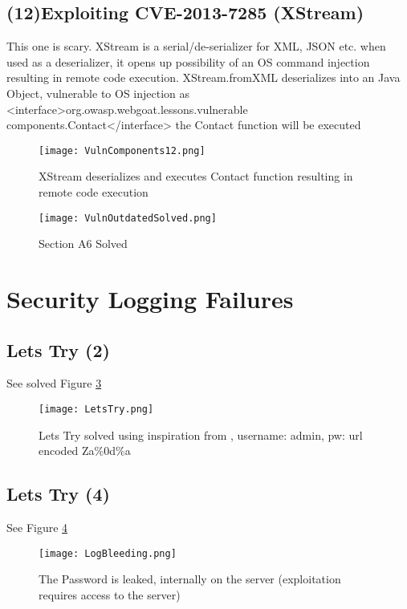 \documentclass[
	letterpaper, %
	10pt, %
	unnumberedsections, %
	twoside, %
]{APAAssignment}
\begin{document}
\begin{appendices}
\subsection{(12)Exploiting CVE-2013-7285 (XStream)}\label{app:VulnAndOutdatedComponents12}\label{app:XStrem}
This one is scary. XStream is a serial/de-serializer for XML, JSON etc. when used as a deserializer, it opens up possibility of an OS command injection resulting in remote code execution. XStream.fromXML deserializes into an Java Object, vulnerable to OS injection as <interface>org.owasp.webgoat.lessons.vulnerable components.Contact</interface> the Contact function will be executed   

\begin{figure}[!ht] %
	\centering
	\texttt{[image: VulnComponents12.png]}
	\caption{XStream deserializes and executes Contact function resulting in remote code execution}
	\label{fig:app:vuln12}
\end{figure}


\begin{figure}[!ht] %
	\centering
	\texttt{[image: VulnOutdatedSolved.png]}
	\caption{Section A6 Solved}
	\label{fig:app:vulnSolved}
\end{figure}

\section{Security Logging Failures}\label{app:SecurityLogging}
\subsection{Lets Try (2)}
See solved Figure \ref{fig:app:LetsTry}

\begin{figure}[!htp] %
	\centering
	\texttt{[image: LetsTry.png]}
	\caption{Lets Try solved using inspiration from \cite{CycubicsDocsWebGoat}, username: admin, pw: url encoded Za\%0d\%a}
	\label{fig:app:LetsTry}
\end{figure}

\subsection{Lets Try (4)}
See Figure \ref{fig:app:LogBleeding}

\begin{figure}[!htp] %
	\centering
	\texttt{[image: LogBleeding.png]}
	\caption{The Password is leaked, internally on the server (exploitation requires access to the server)}
	\label{fig:app:LogBleeding}
\end{figure}


\end{appendices}
\end{document}
